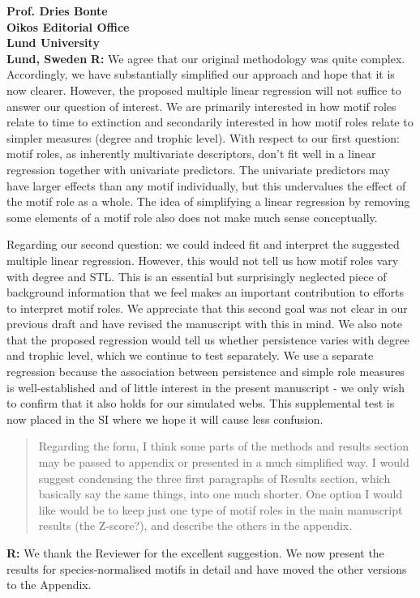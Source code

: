 \documentclass[12pt]{letter}
\begin{document}
\begin{letter}{\bf Prof. Dries Bonte\\
Oikos Editorial Office \\
Lund University \\
Lund, Sweden}
  \textbf{R:} We agree that our original methodology was quite complex. 
  Accordingly, we have substantially simplified our approach and hope that it is now clearer.
  However, the proposed multiple linear regression will not suffice to answer our question of interest. We are primarily interested in how motif roles relate to time to extinction and secondarily interested in how motif roles relate to simpler measures (degree and trophic level). With respect to our first question: motif roles, as inherently multivariate descriptors, don't fit well in a linear regression together with univariate predictors. The univariate predictors may have larger effects than any motif individually, but this undervalues the effect of the motif role as a whole. The idea of simplifying a linear regression by removing some elements of a motif role also does not make much sense conceptually.


  Regarding our second question: we could indeed fit and interpret the suggested multiple linear regression. However, this would not tell us how motif roles vary with degree and STL. This is an essential but surprisingly neglected piece of background information that we feel makes an important contribution to efforts to interpret motif roles.
  We appreciate that this second goal was not clear in our previous draft and have revised the manuscript with this in mind.
  We also note that the proposed regression would tell us whether persistence varies with degree and trophic level, which we continue to test separately.
  We use a separate regression because the association between persistence and simple role measures is well-established and of little interest in the present manuscript - we only wish to confirm that it also holds for our simulated webs. 
  This supplemental test is now placed in the SI where we hope it will cause less confusion.


  \begin{quotation}
  Regarding the form, I think some parts of the methods and results section may be passed to appendix or presented in a much simplified way. I would suggest condensing the three first paragraphs of Results section, which basically say the same things, into one much shorter. One option I would like would be to keep just one type of motif roles in the main manuscript results (the Z-score?), and describe the others in the appendix.
  \end{quotation}


  \textbf{R:}  We thank the Reviewer for the excellent suggestion. We now present the results for species-normalised motifs in detail and have moved the other versions to the Appendix.



\end{letter}
\end{document}
